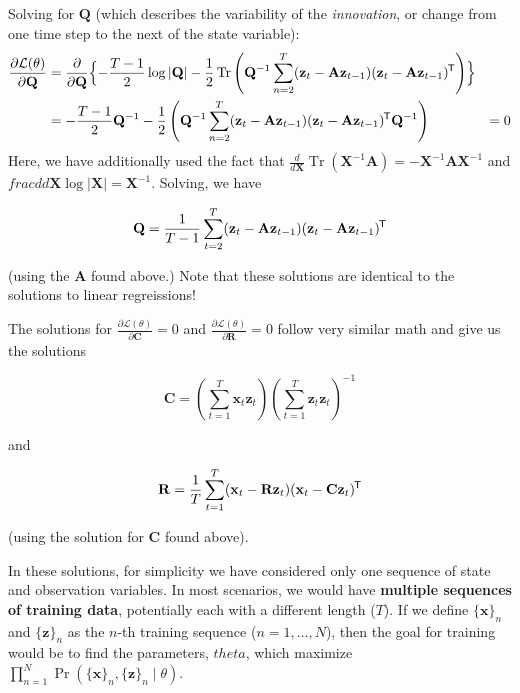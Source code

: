 \documentclass[11pt]{article}
\DeclareMathOperator{\Tr}{Tr}
\newcommand{\logdet}[1]{\log \left| {#1} \right| }
\newcommand{\xb}{\mathbf{x}}
\newcommand{\zb}{\mathbf{z}}
\newcommand{\Ab}{\mathbf{A}}
\newcommand{\Qb}{\mathbf{Q}}
\newcommand{\Cb}{\mathbf{C}}
\newcommand{\Rb}{\mathbf{R}}
\newcommand*{\tran}{^{\mkern-1.5mu\mathsf{T}}}
\begin{document}
Solving for $\Qb$ (which describes the variability of the \textit{innovation}, or
change from one time step to the next of the state variable):
\begin{align*}
  \frac{\partial \mathcal{L}(\theta)}{\partial \Qb} &=
    \frac{\partial}{\partial \Qb} \Bigl\lbrace
    -\frac{T-1}{2}\logdet{\Qb} -\frac{1}{2} \Tr\left( \Qb^{-1} \sum_{n=2}^T
    (\zb_t - \Ab \zb_{t-1}) (\zb_t - \Ab \zb_{t-1})\tran \right)\Bigr\rbrace \\
  &= -\frac{T-1}{2} \Qb^{-1} -\frac{1}{2} \left( \Qb^{-1} \sum_{n=2}^T
    (\zb_t - \Ab \zb_{t-1}) (\zb_t - \Ab \zb_{t-1})\tran \Qb^{-1}\right)
  &= 0
\end{align*}
Here, we have additionally used the fact that $\frac{d}{d \mathbf{X}}
\Tr(\mathbf{X}^{-1} \Ab) = -\mathbf{X}^{-1} \Ab \mathbf{X}^{-1}$ and
$frac{d}{d \mathbf{X}} \logdet{\mathbf{X}} = \mathbf{X}^{-1}$. Solving, we have
\begin{framed}
  \begin{equation}
    \Qb = \frac{1}{T-1} \sum_{t=2}^T (\zb_t - \Ab \zb_{t-1})
    (\zb_t - \Ab \zb_{t-1})\tran
    \label{eqn:innovationSoln}
  \end{equation}
\end{framed}
(using the $\Ab$ found above.) Note that these solutions are identical to the
solutions to linear regreissions!

The solutions for $\frac{\partial \mathcal{L}(\theta)}{\partial \Cb} = 0$ and
$\frac{\partial \mathcal{L}(\theta)}{\partial \Rb} = 0$ follow very similar
math and give us the solutions
\begin{framed}
  \begin{equation}
    \Cb = \left(\sum_{t=1}^T \xb_t \zb_t \right)
        \left(\sum_{t=1}^T \zb_t \zb_t \right)^{-1}
    \label{eqn:obsSoln}
  \end{equation}
\end{framed}
and
\begin{framed}
  \begin{equation}
    \Rb = \frac{1}{T} \sum_{t=1}^T (\xb_t - \Rb \zb_t) (\xb_t - \Cb \zb_t)\tran
    \label{eqn:obsNoiseSoln}
  \end{equation}
\end{framed}
(using the solution for $\Cb$ found above).

In these solutions, for simplicity we have considered only one sequence of state
and observation variables. In most scenarios, we would have \textbf{multiple
sequences of training data}, potentially each with a different length ($T$). If
we define $\{\xb\}_n$ and $\{\zb\}_n$ as the $n$-th training sequence
($n = 1, \ldots, N$), then the goal for training would be to find the parameters,
$theta$, which maximize $\prod_{n=1}^N \Pr(\{\xb\}_n, \{\zb\}_n \mid \theta)$.
\end{document}
